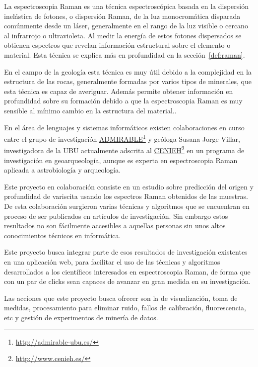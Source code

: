 
La espectroscopia Raman es una técnica espectroscópica basada en la dispersión
inelástica de fotones, o dispersión Raman, de la luz monocromática disparada
comúnmente desde un láser\cite{raman-basics}, generalmente en el rango de la luz
visible o cercano al infrarrojo o ultravioleta\cite{wiki:raman-en}. Al medir la
energía de estos fotones dispersados se obtienen espectros que revelan
información estructural sobre el elemento o material. Esta técnica se explica
más en profundidad en la sección~\ref{def:raman}.

En el campo de la geología esta técnica es muy útil debido a la complejidad en
la estructura de las rocas, generalmente formadas por varios tipos de minerales,
que esta técnica es capaz de averiguar. Además permite obtener información en
profundidad sobre su formación debido a
que la espectroscopia Raman es muy sensible al mínimo cambio en la
estructura del material.\cite{quora:raman-geology}.

En el área de lenguajes y sistemas informáticos existen colaboraciones en curso
entre el grupo de investigación
\href{http://admirable-ubu.es/}{ADMIRABLE}\footnote{\url{http://admirable-ubu.es/}}
y geóloga Susana Jorge Villar, investigadora de la UBU actualmente adscrita al
\href{http://www.cenieh.es/}{CENIEH}\footnote{\url{http://www.cenieh.es/}} en un
programa de investigación en geoarqueología\cite{susana-cenieh}, aunque es
experta en espectroscopia Raman aplicada a astrobiología y
arqueología\cite{susana-ubu}.

Este proyecto en colaboración consiste en un estudio sobre predicción del origen
y profundidad de variscita usando los espectros Raman obtenidos de las muestras.
De esta colaboración surgieron varias técnicas y algoritmos que se encuentran en
proceso de ser publicados en artículos de investigación. Sin embargo estos
resultados no son fácilmente accesibles a aquellas personas sin unos altos
conocimientos técnicos en informática.

Este proyecto busca integrar parte de esos resultados de investigación
existentes en una aplicación web, para facilitar el uso de las técnicas y
algoritmos desarrollados a los científicos interesados en espectroscopia Raman,
de forma que con un par de clicks sean capaces de avanzar en gran medida en su
investigación.

Las acciones que este proyecto busca ofrecer son la de visualización, toma de
medidas, procesamiento para eliminar ruido, fallos de calibración,
fluorescencia, etc y gestión de experimentos de minería de datos.

